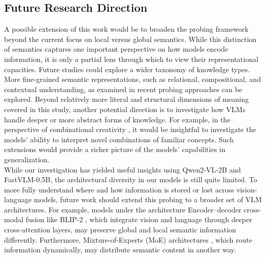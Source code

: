 \documentclass[11pt]{article}
\begin{document}
\subsection{Future Research Direction}
A possible extension of this work would be to broaden the probing framework beyond the current focus on local versus global semantics.
While this distinction of semantics captures one important perspective on how models encode information, it is only a partial lens through which to view their representational capacities.
Future studies could explore a wider taxonomy of knowledge types.
More fine-grained semantic representations, such as relational, compositional, and contextual understanding, as examined in recent probing approaches \cite{schiappa2023ProbingConceptualUnderstanding} can be explored.
Beyond relatively more literal and structural dimensions of meaning covered in this study, another potential direction is to investigate how VLMs handle deeper or more abstract forms of knowledge.
For example, in the perspective of combinational creativity \cite{peng2025ProbingandInducingCombinationalCreativity}, it would be insightful to investigate the models' ability to interpret novel combinations of familiar concepts. Such extensions would provide a richer picture of the models’ capabilities in generalization. \\
While our investigation has yielded useful insights using Qwen2-VL-2B and FastVLM-0.5B, the architectural diversity in our models is still quite limited.
To more fully understand where and how information is stored or lost across vision-language models, future work should extend this probing to a broader set of VLM architectures.
For example, models under the architecture Encoder–decoder cross-modal fusion like BLIP-2 \cite{li2023BLIP2}, which integrate vision and language through deeper cross-attention layers, may preserve global and local semantic information differently.
Furthermore, Mixture-of-Experts (MoE) architectures \cite{lin2024MoELLaVA}, which route information dynamically, may distribute semantic content in another way.
\end{document}
